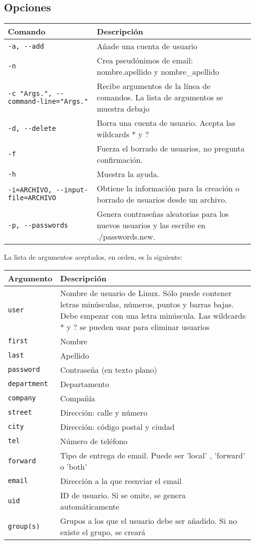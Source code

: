 \subsection{Opciones}
\begin{longtable}{p{} | p{} }
\textbf{Comando} & \textbf{Descripción} \\\hline
\lstinline!-a, --add! & Añade una cuenta de usuario\\\hline
\lstinline!-n! & Crea pseudónimos de email: nombre.apellido y nombre\_apellido\\\hline
\lstinline!-c "Args.", --command-line="Args."! & Recibe argumentos de la línea de comandos. La lista de argumentos se muestra debajo\\\hline
\lstinline!-d, --delete! & Borra una cuenta de usuario. Acepta las wildcards * y ?\\\hline
\lstinline!-f! & Fuerza el borrado de usuarios, no pregunta confirmación.\\\hline
\lstinline!-h! & Muestra la ayuda.\\\hline
\lstinline!-i=ARCHIVO, --input-file=ARCHIVO! & Obtiene la información para la creación o borrado de usuarios desde un archivo.\\\hline
\lstinline!-p, --passwords! & Genera contraseñas aleatorias para los nuevos usuarios y las escribe en ./passwords.new.
\end{longtable}

La lista de argumentos aceptados, en orden, es la siguiente:\\

\begin{longtable}{p{} | p{} }
\textbf{Argumento} & \textbf{Descripción}\\\hline
\lstinline!user! & Nombre de usuario de Linux. Sólo puede contener letras minúsculas, números, puntos y barras bajas. Debe empezar con una letra minúscula. Las wildcards * y ? se pueden usar para eliminar usuarios\\\hline
\lstinline!first! & Nombre\\\hline
\lstinline!last! & Apellido\\\hline
\lstinline!password! & Contraseña (en texto plano)\\\hline
\lstinline!department! & Departamento\\\hline
\lstinline!company! & Compañía\\\hline
\lstinline!street! & Dirección: calle y número\\\hline
\lstinline!city! & Dirección: código postal y ciudad \\\hline
\lstinline!tel! & Número de teléfono \\\hline
\lstinline!forward! & Tipo de entrega de email. Puede ser 'local' , 'forward' o 'both'\\\hline
\lstinline!email! & Dirección a la que reenviar el email \\\hline
\lstinline!uid! & ID de usuario. Si se omite, se genera automáticamente \\\hline
\lstinline!group(s)! & Grupos a los que el usuario debe ser añadido. Si no existe el grupo, se creará \\
\end{longtable}


